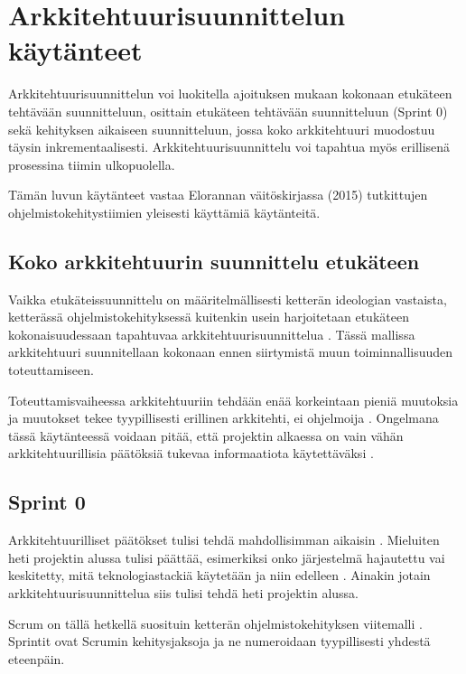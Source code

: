 \chapter{Arkkitehtuurisuunnittelun käytänteet}

Arkkitehtuurisuunnittelun voi luokitella ajoituksen mukaan kokonaan etukäteen tehtävään suunnitteluun, osittain etukäteen tehtävään suunnitteluun (Sprint 0) sekä kehityksen aikaiseen suunnitteluun, jossa koko arkkitehtuuri muodostuu täysin inkrementaalisesti. Arkkitehtuurisuunnittelu voi tapahtua myös erillisenä prosessina tiimin ulkopuolella.

Tämän luvun käytänteet vastaa Elorannan väitöskirjassa (2015) tutkittujen ohjelmistokehitystiimien yleisesti käyttämiä käytänteitä.

\section{Koko arkkitehtuurin suunnittelu etukäteen}
Vaikka etukäteissuunnittelu on määritelmällisesti ketterän ideologian vastaista, ketterässä ohjelmistokehityksessä kuitenkin usein harjoitetaan etukäteen kokonaisuudessaan tapahtuvaa arkkitehtuurisuunnittelua \citep{rost_distilling_2015, eloranta2015techniques}. Tässä mallissa arkkitehtuuri suunnitellaan kokonaan ennen siirtymistä muun toiminnallisuuden toteuttamiseen. 

Toteuttamisvaiheessa arkkitehtuuriin tehdään enää korkeintaan pieniä muutoksia ja muutokset tekee tyypillisesti erillinen arkkitehti, ei ohjelmoija \citep{eloranta2015techniques}. Ongelmana tässä käytänteessä voidaan pitää, että projektin alkaessa on vain vähän arkkitehtuurillisia päätöksiä tukevaa informaatiota käytettäväksi \citep{waterman_how_2015}.

\section{Sprint 0}

Arkkitehtuurilliset päätökset tulisi tehdä mahdollisimman aikaisin \citep{abrahamsson2010agility}. Mieluiten heti projektin alussa tulisi päättää, esimerkiksi onko järjestelmä hajautettu vai keskitetty, mitä teknologiastackiä käytetään ja niin edelleen \citep{eloranta2015techniques}. Ainakin jotain arkkitehtuurisuunnittelua siis tulisi tehdä heti projektin alussa.

Scrum on tällä hetkellä suosituin ketterän ohjelmistokehityksen viitemalli \citep{noauthor_14th_2020}. Sprintit ovat Scrumin kehitysjaksoja ja ne numeroidaan tyypillisesti yhdestä eteenpäin.

